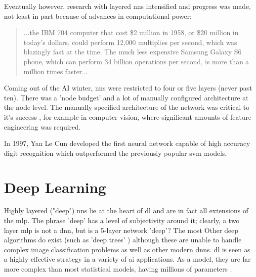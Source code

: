 Eventually however, research with layered \gls{nn}s intensified and progress was made, not least in part because of advances in computational power;

\begin{quote}
...the IBM 704 computer that cost \$2 million in 1958, or \$20 million in today’s dollars, could perform 12,000 multiplies per second, which was blazingly fast at the time. The much less expensive Samsung Galaxy S6 phone, which can perform 34 billion operations per second, is more than a million times faster...\cite{unreasonable_dl}
\end{quote}


\bigskip
Coming out of the AI winter, \gls{nn}s were restricted to four or five layers (never past ten). There was a 'node budget' and a lot of manually configured architecture at the node level. The manually specified architecture of the network was critical to it's success \cite{manual_architecture}, for example in computer vision, where significant amounts of feature engineering was required. 

In 1997, Yan Le Cun developed the first neural network capable of high accuracy digit recognition which outperformed the previously popular \gls{svm} models. \bigskip



\section{Deep Learning}


Highly layered ("deep") \gls{nn}s lie at the heart of \gls{dl} and are in fact all extensions of the \gls{mlp}. The phrase 'deep' has a level of subjectivity around it; clearly, a two \gls{layer} \gls{mlp} is not a \gls{dnn}, but is a 5-layer network 'deep'? The most Other deep algorithms do exist (such as 'deep trees' \cite{deep_forest}) although these are unable to handle complex image classification problems as well as other modern {dnn}s. \gls{dl} is seen as a highly effective strategy in a variety of \gls{ai} applications. As a model, they are far more complex than most statistical models, having millions of parameters \cite{unreasonable_dl}.  \bigskip

